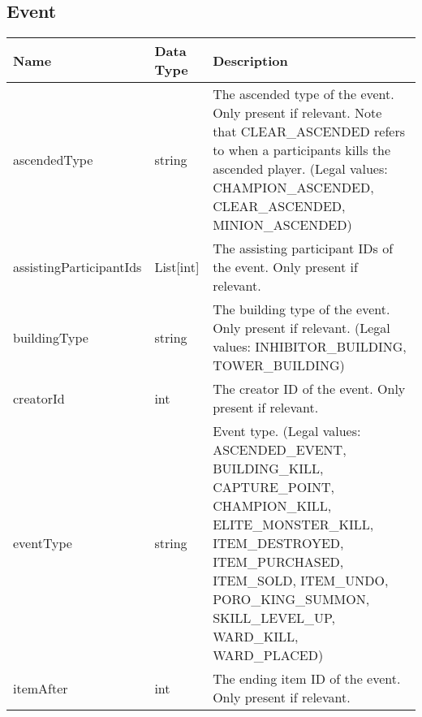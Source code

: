 \subsection{Event}
\begin{table}[!h]
\tiny
\centering
\begin{tabular}{llp{5cm}}
\textbf{Name}           & \textbf{Data Type} & \textbf{Description}                                                                                                                                                                                                                        \\ \hline
ascendedType            & string             & The ascended type of the event. Only present if relevant. Note that CLEAR\_ASCENDED refers to when a participants kills the ascended player. (Legal values: CHAMPION\_ASCENDED, CLEAR\_ASCENDED, MINION\_ASCENDED)                          \\ \hline
assistingParticipantIds & List{[}int{]}      & The assisting participant IDs of the event. Only present if relevant.                                                                                                                                                                       \\ \hline
buildingType            & string             & The building type of the event. Only present if relevant. (Legal values: INHIBITOR\_BUILDING, TOWER\_BUILDING)                                                                                                                              \\ \hline
creatorId               & int                & The creator ID of the event. Only present if relevant.                                                                                                                                                                                      \\ \hline
eventType               & string             & Event type. (Legal values: ASCENDED\_EVENT, BUILDING\_KILL, CAPTURE\_POINT, CHAMPION\_KILL, ELITE\_MONSTER\_KILL, ITEM\_DESTROYED, ITEM\_PURCHASED, ITEM\_SOLD, ITEM\_UNDO, PORO\_KING\_SUMMON, SKILL\_LEVEL\_UP, WARD\_KILL, WARD\_PLACED) \\ \hline
itemAfter               & int                & The ending item ID of the event. Only present if relevant.                                                                                                                                                                                  \\ \hline

\end{tabular}
\end{table}
